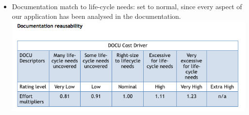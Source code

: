 \documentclass{article}
\begin{document}
\begin{flushleft}
\begin{itemize}
\vspace{0.5cm}
\item Documentation match to life-cycle needs: set to normal, since every aspect of our application has been analysed in  the documentation.\\
\vspace{0.5cm}
\includegraphics[scale=0.5]{cocomo/5_DOCU}


\end{itemize}
\end{flushleft}
\end{document}
